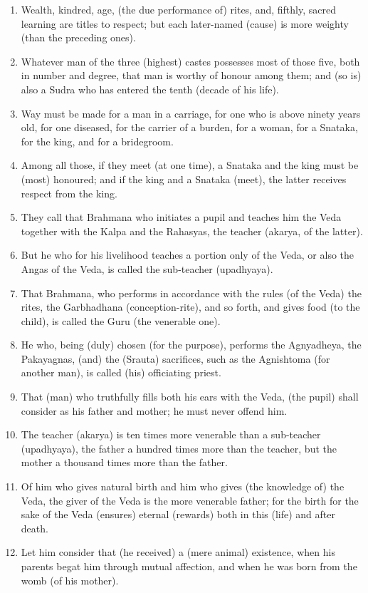 \begin{enumerate}
\item Wealth, kindred, age, (the due performance of) rites, and, fifthly, sacred learning are titles to respect; but each later-named (cause) is more weighty (than the preceding ones).
\item Whatever man of the three (highest) castes possesses most of those five, both in number and degree, that man is worthy of honour among them; and (so is) also a Sudra who has entered the tenth (decade of his life).
\item Way must be made for a man in a carriage, for one who is above ninety years old, for one diseased, for the carrier of a burden, for a woman, for a Snataka, for the king, and for a bridegroom.
\item Among all those, if they meet (at one time), a Snataka and the king must be (most) honoured; and if the king and a Snataka (meet), the latter receives respect from the king.
\item They call that Brahmana who initiates a pupil and teaches him the Veda together with the Kalpa and the Rahasyas, the teacher (akarya, of the latter).
\item But he who for his livelihood teaches a portion only of the Veda, or also the Angas of the Veda, is called the sub-teacher (upadhyaya).
\item That Brahmana, who performs in accordance with the rules (of the Veda) the rites, the Garbhadhana (conception-rite), and so forth, and gives food (to the child), is called the Guru (the venerable one).
\item He who, being (duly) chosen (for the purpose), performs the Agnyadheya, the Pakayagnas, (and) the (Srauta) sacrifices, such as the Agnishtoma (for another man), is called (his) officiating priest.
\item That (man) who truthfully fills both his ears with the Veda, (the pupil) shall consider as his father and mother; he must never offend him.
\item The teacher (akarya) is ten times more venerable than a sub-teacher (upadhyaya), the father a hundred times more than the teacher, but the mother a thousand times more than the father.
\item Of him who gives natural birth and him who gives (the knowledge of) the Veda, the giver of the Veda is the more venerable father; for the birth for the sake of the Veda (ensures) eternal (rewards) both in this (life) and after death.
\item Let him consider that (he received) a (mere animal) existence, when his parents begat him through mutual affection, and when he was born from the womb (of his mother).

\end{enumerate}
